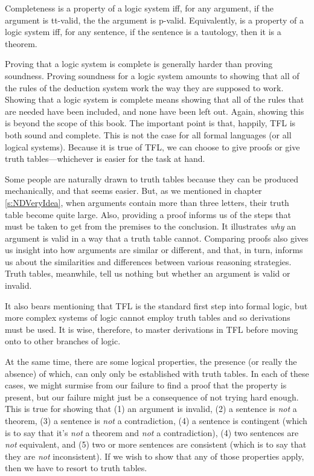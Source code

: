 \begin{factboxy}{Completeness}\label{def:completeness}
 is a property of a logic system iff, for any argument, if the argument is tt-valid, the the argument is p-valid.
\tcblower
Equivalently,  is a property of a logic system iff, for any sentence, if the sentence is a tautology, then it is a theorem.
\end{factboxy}

Proving that a logic system is complete is generally harder than proving soundness. Proving soundness for a logic system amounts to showing that all of the rules of the deduction system work the way they are supposed to work. Showing that a logic system is complete means showing that all of the rules that are needed have been included, and none have been left out.
Again, showing this is beyond the scope of this book. The important point is that, happily, TFL is both sound and complete. This is not the case for all formal languages (or all logical systems). Because it is true of TFL, we can choose to give proofs or give truth tables---whichever is easier for the task at hand.

Some people are naturally drawn to truth tables because they can be produced mechanically, and that seems easier. But, as we mentioned in chapter \ref{s:NDVeryIdea}, when arguments contain more than three letters, their truth table become quite large. Also, providing a proof informs us of the steps that must be taken to get from the premises to the conclusion. It illustrates \textit{why} an argument is valid in a way that a truth table cannot. Comparing proofs also gives us insight into how arguments are similar or different, and that, in turn, informs us about the similarities and differences between various reasoning strategies. Truth tables, meanwhile, tell us nothing but whether an argument is valid or invalid.

It also bears mentioning that TFL is the standard first step into formal logic, but more complex systems of logic cannot employ truth tables and so derivations must be used. It is wise, therefore, to master derivations in TFL before moving onto to other branches of logic. 

At the same time, there are some logical properties, the presence (or really the absence) of which, can only only be established with truth tables. In each of these cases, we might surmise from our failure to find a proof that the property is present, but our failure might just be a consequence of not trying hard enough. This is true for showing that (1) an argument is invalid, (2) a sentence is \textit{not} a theorem, (3) a sentence is \textit{not} a contradiction, (4) a sentence is contingent (which is to say that it's \textit{not} a theorem and \textit{not} a contradiction), (4) two sentences are \textit{not} equivalent, and (5) two or more sentences are consistent (which is to say that they are \textit{not} inconsistent). If we wish to show that any of those properties apply, then we have to resort to truth tables. 


